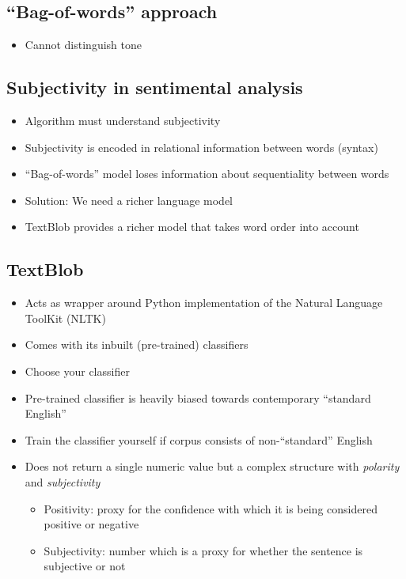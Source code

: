 \documentclass[a4paper]{article}
\begin{document}
\subsection{``Bag-of-words'' approach}
\begin{itemize}
    \item Cannot distinguish tone
\end{itemize}

\subsection{Subjectivity in sentimental analysis}
\begin{itemize}
    \item Algorithm must understand subjectivity
    \item Subjectivity is encoded in relational information between words (syntax)
    \item ``Bag-of-words'' model loses information about sequentiality between words
    \item Solution: We need a richer language model
    \item TextBlob provides a richer model that takes word order into account
\end{itemize}

\subsection{TextBlob}
\begin{itemize}
    \item Acts as wrapper around Python implementation of the Natural Language ToolKit (NLTK)
    \item Comes with its inbuilt (pre-trained) classifiers
    \item Choose your classifier
    \item Pre-trained classifier is heavily biased towards contemporary ``standard English''
    \item Train the classifier yourself if corpus consists of non-``standard'' English
    \item Does not return a single numeric value but a complex structure with \textit{polarity} and \textit{subjectivity}
    \begin{itemize}[label=$\circ$]
        \item Positivity: proxy for the confidence with which it is being considered positive or negative
        \item Subjectivity: number which is a proxy for whether the sentence is subjective or not
    \end{itemize}
\end{itemize}
\end{document}
